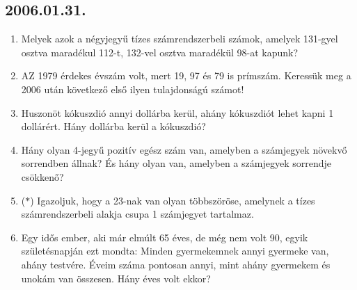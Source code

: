 \documentclass{article}
\begin{document}
\subsection*{2006.01.31.}
\begin{enumerate}
\item Melyek azok a négyjegyű tízes számrendszerbeli számok, amelyek 131-gyel osztva maradékul 112-t, 132-vel osztva maradékül 98-at kapunk?

\item AZ 1979 érdekes évszám volt, mert 19, 97 és 79 is prímszám. Keressük meg a 2006 után következő első ilyen tulajdonságú számot!

\item Huszonöt kókuszdió annyi dollárba kerül, ahány kókuszdiót lehet kapni 1 dollárért. Hány dollárba kerül a kókuszdió?

\item Hány olyan 4-jegyű pozitív egész szám van, amelyben a számjegyek növekvő sorrendben állnak? És hány olyan van, amelyben a számjegyek sorrendje csökkenő?

\item ($*$) Igazoljuk, hogy a 23-nak van olyan többszöröse, amelynek a tízes számrendszerbeli alakja csupa 1 számjegyet tartalmaz.

\item Egy idős ember, aki már elmúlt 65 éves, de még nem volt 90, egyik születésnapján ezt mondta: Minden gyermekemnek annyi gyermeke van, ahány testvére. Éveim száma pontosan annyi, mint ahány gyermekem és unokám van összesen. Hány éves volt ekkor?

 
\end{enumerate}
\end{document}
